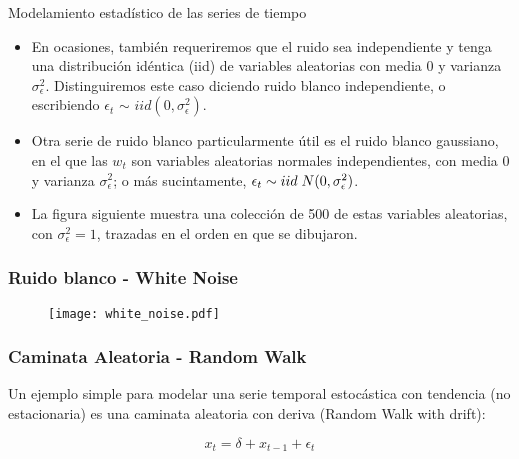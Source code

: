 \documentclass[xcolor=(list of options)]{beamer}
\begin{document}
\begin{section}{Modelamiento estad\'istico de las series de tiempo}
\begin{frame}
\begin{itemize}
\item En ocasiones, tambi\'en requeriremos que el ruido sea independiente y tenga una distribuci\'on id\'entica (iid) de variables aleatorias con media 0 y varianza $\sigma^2_\epsilon$. Distinguiremos este caso diciendo ruido blanco independiente, o escribiendo $\epsilon_t$ $\sim$ $iid (0, \sigma^2_\epsilon)$. 
\item Otra serie de ruido blanco particularmente \'util es el ruido blanco gaussiano, en el que las $w_t$ son variables aleatorias normales independientes, con media $0$ y varianza $\sigma^2_\epsilon$; o m\'as sucintamente, $\epsilon_t \sim iid \hspace{0.1cm}N(0, \sigma^2_\epsilon)$. 
\item La figura siguiente muestra una colecci\'on de 500 de estas variables aleatorias, con $\sigma^2_\epsilon=1$, trazadas en el orden en que se dibujaron.
\end{itemize}

\end{frame}

\begin{frame}
\frametitle{Ruido blanco - White Noise}

\begin{figure}[t!]
\texttt{[image: white\_noise.pdf]}
\end{figure}

\end{frame}
\begin{frame}
\frametitle{Caminata Aleatoria - Random Walk}

Un ejemplo simple para modelar una serie temporal estoc\'astica con tendencia (no estacionaria) es una caminata aleatoria con deriva (Random Walk with drift):

\begin{equation*}
x_t = \delta + x_{t-1} + \epsilon_t 
\end{equation*}


\end{frame}
\end{section}
\end{document}
